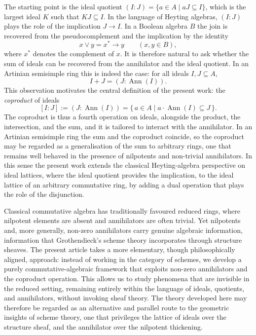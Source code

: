 \documentclass{amsart}
\DeclareMathOperator{\ann}{Ann}
\begin{document}
The starting point is the ideal quotient $(I:J)=\{a\in A\mid aJ\subseteq I\}$, which is the largest ideal $K$ such that $KJ\subseteq I$. In the language of Heyting algebras, $(I:J)$ plays the role of the implication $J\to I$. In a Boolean algebra $B$ the join is recovered from the pseudocomplement and the implication by the identity
\[
x\vee y = x^{*}\to y \qquad (x,y\in B),
\]
where $x^{*}$ denotes the complement of $x$. It is therefore natural to ask whether the sum of ideals can be recovered from the annihilator and the ideal quotient. In an Artinian semisimple ring this is indeed the case: for all ideals $I,J\subseteq A$,
\[
I+J = (J:\ann(I)).
\]
This observation motivates the central definition of the present work: the \emph{coproduct} of ideals
\[
[I:J] := (J:\ann(I)) = \{\,a\in A\mid a\cdot\ann(I)\subseteq J\,\}.
\]
The coproduct is thus a fourth operation on ideals, alongside the product, the intersection, and the sum, and it is tailored to interact with the annihilator. In an Artinian semisimple ring the sum and the coproduct coincide, so the coproduct may be regarded as a generalisation of the sum to arbitrary rings, one that remains well behaved in the presence of nilpotents and non-trivial annihilators. In this sense the present work extends the classical Heyting-algebra perspective on ideal lattices, where the ideal quotient provides the implication, to the ideal lattice of an arbitrary commutative ring, by adding a dual operation that plays the role of the disjunction.

Classical commutative algebra has traditionally favoured reduced rings, where nilpotent elements are absent and annihilators are often trivial. Yet nilpotents and, more generally, non-zero annihilators carry genuine algebraic information, information that Grothendieck's scheme theory incorporates through structure sheaves. The present article takes a more elementary, though philosophically aligned, approach: instead of working in the category of schemes, we develop a purely commutative-algebraic framework that exploits non-zero annihilators and the coproduct operation. This allows us to study phenomena that are invisible in the reduced setting, remaining entirely within the language of ideals, quotients, and annihilators, without invoking sheaf theory. The theory developed here may therefore be regarded as an alternative and parallel route to the geometric insights of scheme theory, one that privileges the lattice of ideals over the structure sheaf, and the annihilator over the nilpotent thickening.
\end{document}
